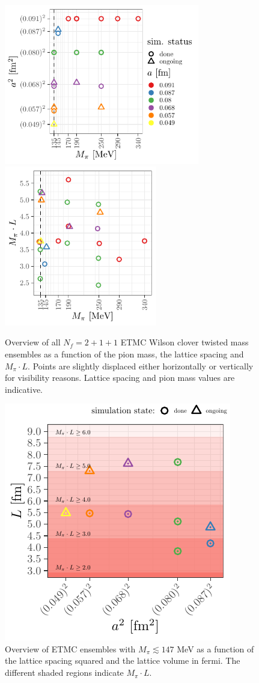 \documentclass[a4paper,11pt]{article}
\begin{document}
\begin{figure}
  \includegraphics[height=7cm]{plots/ensembles_asquared_mpi}\hfill
  \includegraphics[height=7cm]{plots/ensembles_L_vs_mpi}
  \caption{Overview of all $N_f=2+1+1$ ETMC Wilson clover twisted mass ensembles as a function of the pion mass, the lattice spacing and $M_\pi \cdot L$. Points are slightly displaced either horizontally or vertically for visibility reasons. Lattice spacing and pion mass values are indicative.}
  \label{fig:ensemble_overview}
\end{figure}

\begin{figure}
  \includegraphics[width=0.5\linewidth]{plots/ensembles_phys_point}
  \caption{Overview of ETMC ensembles with $M_\pi \lesssim 147$ MeV as a function of the lattice spacing squared and the lattice volume in fermi. The different shaded regions indicate $M_\pi \cdot L$.}
  \label{fig:ensembles_phys_point}
\end{figure}
\end{document}
